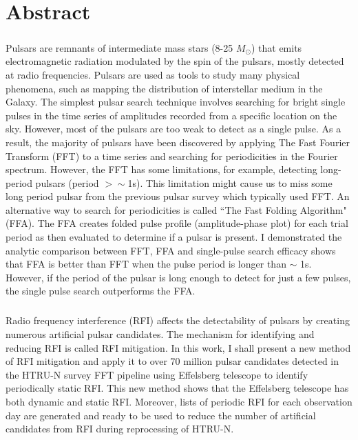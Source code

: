 \documentclass[../chapter1/thesis_msc.tex]{subfiles}
\begin{document}
    \chapter*{Abstract}
    \thispagestyle{plain}
\paragraph{}Pulsars are remnants of intermediate mass stars (8-25 $M_\odot$) that emits electromagnetic radiation modulated by the spin of the pulsars, mostly detected at radio frequencies. Pulsars are used as tools to study many physical phenomena, such as mapping the distribution of interstellar medium in the Galaxy. The simplest pulsar search technique involves searching for bright single pulses in the time series of amplitudes recorded from a specific location on the sky. However, most of the pulsars are too weak to detect as a single pulse. As a result, the majority of pulsars have been discovered by applying The Fast Fourier Transform (FFT) to a time series and searching for periodicities in the Fourier spectrum.
However, the FFT has some limitations, for example, detecting long-period pulsars (period  $> \sim$1s). This limitation might cause us to miss some long period pulsar from the previous pulsar survey which typically used FFT.
An alternative way to search for periodicities is called ``The Fast Folding Algorithm" (FFA). The FFA creates folded pulse profile (amplitude-phase plot) for each trial period as then evaluated to determine if a pulsar is present. 
 I demonstrated the analytic comparison between FFT, FFA and single-pulse search efficacy shows that FFA is better than FFT when the pulse period is longer than  $\sim$ 1s. However, if the period of the pulsar is long enough to detect for just a few pulses, the single pulse search outperforms the FFA.  

\paragraph{} Radio frequency interference (RFI) affects the detectability of pulsars by creating numerous artificial pulsar candidates. 
The mechanism for identifying and reducing RFI is called RFI mitigation. In this work, I shall present a new method of RFI mitigation and apply it to over 70 million pulsar candidates detected in the HTRU-N survey FFT pipeline using Effelsberg telescope to identify periodically static RFI. This new method shows that the Effelsberg telescope has both dynamic and static RFI. Moreover, lists of periodic RFI for each observation day are generated and ready to be used to reduce the number of artificial candidates from RFI during reprocessing of HTRU-N.  
\end{document}
